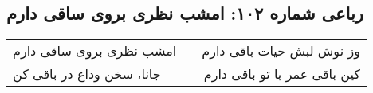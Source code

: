 \begin{center}
\section*{رباعی شماره ۱۰۲: امشب نظری بروی ساقی دارم}
\label{sec:102}
\begin{longtable}{l p{0.5cm} r}
امشب نظری بروی ساقی دارم
&&
وز نوش لبش حیات باقی دارم
\\
جانا، سخن وداع در باقی کن
&&
کین باقی عمر با تو باقی دارم
\\
\end{longtable}
\end{center}
